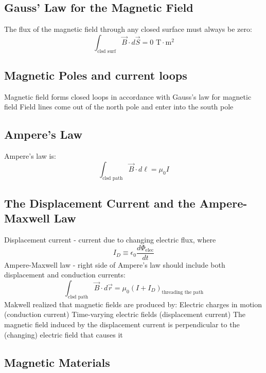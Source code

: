 \documentclass[twocolumn]{article}
\begin{document}
\subsection{Gauss' Law for the Magnetic Field}
\begin{outline}
	\1 The flux of the magnetic field through any closed surface must always be zero: \[\int_{\text{clsd surf}}\vec{B}\cdot d\vec{S}=0\text{ T}\cdot\text{m}^2\]

\end{outline}
\subsection{Magnetic Poles and current loops}
\begin{outline}
	\1 Magnetic field forms closed loops in accordance with Gauss's law for magnetic field 
	\1 Field lines come out of the north pole and enter into the south pole
\end{outline}
\subsection{Ampere's Law}
\begin{outline}
	\1 Ampere's law is: \[\int_{\text{clsd path}}\vec{B}\cdot d\ell=\mu_0I\]
\end{outline}
\subsection{The Displacement Current and the Ampere-Maxwell Law}
\begin{outline}
	\1 Displacement current - current due to changing electric flux, where \[I_D\equiv\epsilon_0\dfrac{d\Phi_{\text{elec}}}{dt}\]
	\1 Ampere-Maxwell law - right side of Ampere's law should include both displacement and conduction currents: \[\int_{\text{clsd path}}\vec{B}\cdot d\vec{r}=\mu_0(I+I_D)_{\text{threading the path}}\]
	\1 Makwell realized that magnetic fields are produced by: 
		\2 Electric charges in motion (conduction current)
		\2 Time-varying electric fields (displacement current)
	\1 The magnetic field induced by the displacement current is perpendicular to the (changing) electric field that causes it
	
\end{outline}
\subsection{Magnetic Materials}
\begin{outline}
	\1 
\end{outline}
\end{document}
